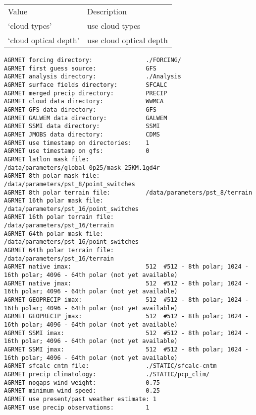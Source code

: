  \begin{tabular}{ll}
 Value                 & Description             \\
 `cloud types'         & use cloud types         \\
 `cloud optical depth' & use cloud optical depth \\
 \end{tabular}
 

 \begin{Verbatim}[frame=single]
AGRMET forcing directory:               ./FORCING/
AGRMET first guess source:              GFS
AGRMET analysis directory:              ./Analysis
AGRMET surface fields directory:        SFCALC
AGRMET merged precip directory:         PRECIP
AGRMET cloud data directory:            WWMCA
AGRMET GFS data directory:              GFS
AGRMET GALWEM data directory:           GALWEM
AGRMET SSMI data directory:             SSMI
AGRMET JMOBS data directory:            CDMS
AGRMET use timestamp on directories:    1
AGRMET use timestamp on gfs:            0
AGRMET latlon mask file:                /data/parameters/global_0p25/mask_25KM.1gd4r
AGRMET 8th polar mask file:             /data/parameters/pst_8/point_switches
AGRMET 8th polar terrain file:          /data/parameters/pst_8/terrain
AGRMET 16th polar mask file:            /data/parameters/pst_16/point_switches
AGRMET 16th polar terrain file:         /data/parameters/pst_16/terrain
AGRMET 64th polar mask file:            /data/parameters/pst_16/point_switches
AGRMET 64th polar terrain file:         /data/parameters/pst_16/terrain
AGRMET native imax:                     512  #512 - 8th polar; 1024 - 16th polar; 4096 - 64th polar (not yet available)
AGRMET native jmax:                     512  #512 - 8th polar; 1024 - 16th polar; 4096 - 64th polar (not yet available)
AGRMET GEOPRECIP imax:                  512  #512 - 8th polar; 1024 - 16th polar; 4096 - 64th polar (not yet available)
AGRMET GEOPRECIP jmax:                  512  #512 - 8th polar; 1024 - 16th polar; 4096 - 64th polar (not yet available)
AGRMET SSMI imax:                       512  #512 - 8th polar; 1024 - 16th polar; 4096 - 64th polar (not yet available)
AGRMET SSMI jmax:                       512  #512 - 8th polar; 1024 - 16th polar; 4096 - 64th polar (not yet available)
AGRMET sfcalc cntm file:                ./STATIC/sfcalc-cntm
AGRMET precip climatology:              ./STATIC/pcp_clim/
AGRMET nogaps wind weight:              0.75
AGRMET minimum wind speed:              0.25
AGRMET use present/past weather estimate: 1
AGRMET use precip observations:         1

\end{Verbatim}
